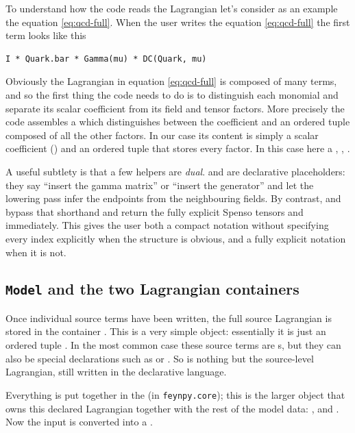 To understand how the code reads the Lagrangian let's consider as an example the equation \ref{eq:qcd-full}. When the user writes the equation \ref{eq:qcd-full} the first term looks like this
\begin{verbatim}
I * Quark.bar * Gamma(mu) * DC(Quark, mu)
\end{verbatim}

Obviously the Lagrangian in equation \ref{eq:qcd-full} is composed of many terms, and so the first thing the code needs to do is to distinguish each monomial and separate its scalar coefficient from its field and tensor factors. More precisely the code assembles a  which distinguishes between the coefficient and an ordered tuple composed of all the other factors. In our case its content is simply a scalar coefficient () and an ordered tuple that stores every factor. In this case here a , , . 

A useful subtlety is that a few helpers are \emph{dual}.  and  are declarative placeholders: they say ``insert the gamma matrix'' or ``insert the generator'' and let the lowering pass infer the endpoints from the neighbouring fields. By contrast,  and  bypass that shorthand and return the fully explicit Spenso tensors  and  immediately. This gives the user both a compact notation without specifying every index explicitly when the structure is obvious, and a fully explicit notation when it is not.

\subsection{\texttt{Model} and the two Lagrangian containers}

Once individual source terms have been written, the full source Lagrangian is stored in the container . This is a very simple object: essentially it is just an ordered tuple . In the most common case these source terms are s, but they can also be special declarations such as  or . So  is nothing but the source-level Lagrangian, still written in the declarative language.

Everything is put together in the  (in \texttt{feynpy.core}); this is the larger object that owns this declared Lagrangian together with the rest of the model data: ,  and . Now the input is converted into a .

